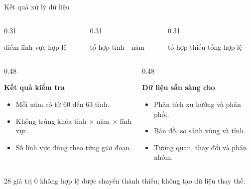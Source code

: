 \begin{frame}[t]{Kết quả xử lý dữ liệu}
  \begin{columns}[T,onlytextwidth]
    \begin{column}{0.31\textwidth}
      \centering
      {\color{Logo1}\fontsize{25}{28}}\par
      {\scriptsize điểm lĩnh vực hợp lệ}
    \end{column}
    \begin{column}{0.31\textwidth}
      \centering
      {\color{Logo1}\fontsize{25}{28}}\par
      {\scriptsize tổ hợp tỉnh - năm}
    \end{column}
    \begin{column}{0.31\textwidth}
      \centering
      {\color{Logo1}\fontsize{25}{28}}\par
      {\scriptsize tổ hợp thiếu tổng hợp lệ}
    \end{column}
  \end{columns}

  \vspace{0.45cm}
  \small
  \begin{columns}[T,onlytextwidth]
    \begin{column}{0.48\textwidth}
      \centerline{\textbf{Kết quả kiểm tra}}
      \begin{itemize}
        \setlength{\itemsep}{6pt}
        \item[-] Mỗi năm có từ 60 đến 63 tỉnh.
        \item[-] Không trùng khóa tỉnh $\times$ năm $\times$ lĩnh vực.
        \item[-] Số lĩnh vực đúng theo từng giai đoạn.
      \end{itemize}
    \end{column}
    \begin{column}{0.48\textwidth}
      \centerline{\textbf{Dữ liệu sẵn sàng cho}}
      \begin{itemize}
        \setlength{\itemsep}{6pt}
        \item[-] Phân tích xu hướng và phân phối.
        \item[-] Bản đồ, so sánh vùng và tỉnh.
        \item[-] Tương quan, thay đổi và phân nhóm.
      \end{itemize}
    \end{column}
  \end{columns}

  \vspace{0.2cm}
  \centering
  {\footnotesize 28 giá trị 0 không hợp lệ được chuyển thành thiếu; không tạo dữ liệu thay thế.}
\end{frame}
